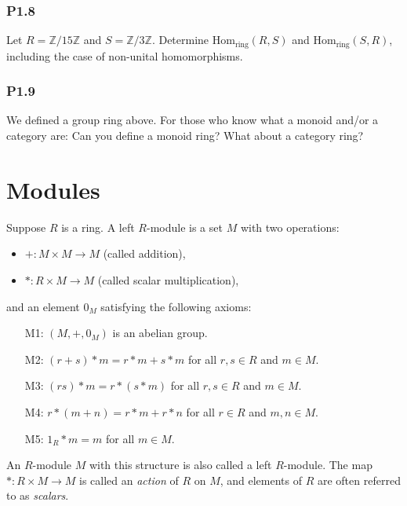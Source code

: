 \documentclass[lang=cn,11pt]{template}
\begin{document}
\subsection*{P1.8} Let \( R = \mathbb{Z}/15\mathbb{Z} \) and \( S = \mathbb{Z}/3\mathbb{Z} \). Determine \( \text{Hom}_{\text{ring}}(R, S) \) and \( \text{Hom}_{\text{ring}}(S, R) \), including the case of non-unital homomorphisms.

\subsection*{P1.9} We defined a group ring above. For those who know what a monoid and/or a category are: Can you define a monoid ring? What about a category ring?











\chapter{Modules}

\begin{definition}
Suppose \( R \) is a ring. A left \( R \)-module is a set \( M \) with two operations:
\begin{itemize}
    \item \( + : M \times M \to M \) (called addition),
    \item \( * : R \times M \to M \) (called scalar multiplication),
\end{itemize}
and an element \( 0_M \) satisfying the following axioms:
\begin{itemize}
    \item[M1:] \( (M, +, 0_M) \) is an abelian group.
    \item[M2:] \( (r + s) * m = r * m + s * m \) for all \( r, s \in R \) and \( m \in M \).
    \item[M3:] \( (rs) * m = r * (s * m) \) for all \( r, s \in R \) and \( m \in M \).
    \item[M4:] \( r * (m + n) = r * m + r * n \) for all \( r \in R \) and \( m, n \in M \).
    \item[M5:] \( 1_R * m = m \) for all \( m \in M \).
\end{itemize}
An \( R \)-module \( M \) with this structure is also called a left \( R \)-module. The map \( * : R \times M \to M \) is called an \textit{action} of \( R \) on \( M \), and elements of \( R \) are often referred to as \textit{scalars}.
\end{definition}
\end{document}
